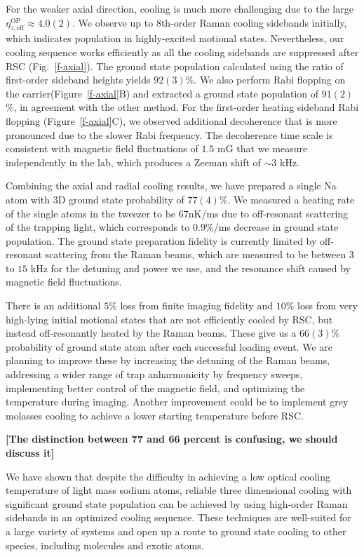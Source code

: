 \documentclass[aps,prl,twocolumn,groupedaddress]{revtex4-1}
\newcommand{\fxnote}[1]{{\textbf{[#1]}}}
\begin{document}
For the weaker axial direction, cooling is much more challenging
due to the large $\eta^{\textrm{OP}}_{z,\textrm{eff}}\approx 4.0(2)$.
We observe up to 8th-order Raman cooling sidebands initially,
which indicates population in highly-excited motional states.
Nevertheless, our cooling sequence works efficiently as all the cooling sidebands are suppressed
after RSC (Fig.~\ref{f-axial}).
The ground state population calculated using the ratio of first-order sideband heights yields
$92(3)$\%. We also perform Rabi flopping on the carrier(Figure~\ref{f-axial}B)
and extracted a ground state population of $91(2)$\%, in agreement with the other method.
For the first-order heating sideband Rabi flopping (Figure~\ref{f-axial}C),
we observed additional decoherence that is more pronounced due to the slower Rabi frequency.
The decoherence time scale is consistent with magnetic field fluctuations of $1.5$ mG
that we measure independently in the lab, which produces a Zeeman shift of $\sim 3$ kHz.

Combining the axial and radial cooling results,
we have prepared a single Na atom with 3D ground state probability of $77(4)$\%.
We measured a heating rate of the single atoms in the tweezer to be $67$nK/ms
due to off-resonant scattering of the trapping light, which
corresponds to $0.9$\%/ms decrease in ground state population\cite{Grimm2000}.
The ground state preparation fidelity is currently limited by off-resonant scattering
from the Raman beams,
which are measured to be between $3$ to $15$ kHz for the detuning and power we use,
and the resonance shift caused by magnetic field fluctuations.

There is an additional $5$\% loss from finite imaging fidelity and $10$\% loss
from very high-lying initial motional states that are not efficiently cooled by RSC,
but instead off-resonantly heated by the Raman beams.
These give us a $66(3)$\% probability of ground state atom after each successful loading event.
We are planning to improve these by increasing the detuning of the Raman beams,
addressing a wider range of trap anharmonicity by frequency sweeps,
implementing better control of the magnetic field, and optimizing the temperature during imaging.
Another improvement could be to implement grey molasses cooling to achieve
a lower starting temperature before RSC\cite{Colzi2016}.

\fxnote{The distinction between 77 and 66 percent is confusing, we should discuss it}

We have shown that despite the difficulty in achieving a low optical cooling temperature
of light mass sodium atoms, reliable three dimensional cooling
with significant ground state population can be achieved by using high-order Raman sidebands
in an optimized cooling sequence.
These techniques are well-suited for a large variety of systems
and open up a route to ground state cooling to other species, including molecules and exotic atoms.
\end{document}
